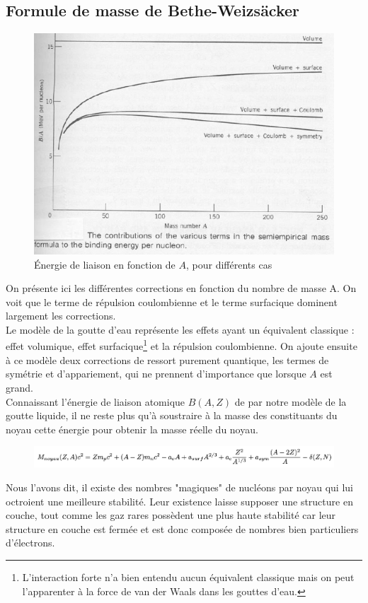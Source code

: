 \subsection{Formule de masse de Bethe-Weizsäcker}


\begin{figure}[ht]
    \centering
    \includegraphics{Images4/correction.PNG}
    \caption{Énergie de liaison en fonction de $A$, pour différents cas}
\end{figure}
On présente ici les différentes corrections en fonction du nombre de masse A. On voit que le terme de répulsion coulombienne et le terme surfacique dominent largement les corrections.\\
Le modèle de la goutte d'eau représente les effets ayant un équivalent classique : effet volumique, effet surfacique\footnote{L'interaction forte n'a bien entendu aucun équivalent classique mais on peut l'apparenter à la force de van der Waals dans les gouttes d'eau.} et la répulsion coulombienne. On ajoute ensuite à ce modèle deux corrections de ressort purement quantique, les termes de symétrie et d'appariement, qui ne prennent d'importance que lorsque $A$ est grand.\\

Connaissant l'énergie de liaison atomique $B(A,Z)$ de par notre modèle de la goutte liquide, il ne reste plus qu'à soustraire à la masse des constituants du noyau cette énergie pour obtenir la masse réelle du noyau.\\

\begin{figure}[ht]
    \centering
    \includegraphics[width=\textwidth] {Images4/Bethe.PNG}
\end{figure}
Nous l'avons dit, il existe des nombres "magiques" de nucléons par noyau qui lui octroient une meilleure stabilité. Leur existence laisse supposer une structure en couche, tout comme les gaz rares possèdent une plus haute stabilité car leur structure en couche est fermée et est donc composée de nombres bien particuliers d'électrons.


